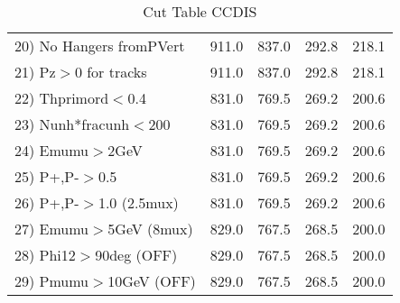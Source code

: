 \begin{table}[h!]
\begin{tabular}{||l||r|r|r|r||}
 20) No Hangers fromPVert &       911.0 &       837.0 &       292.8 &       218.1 \\
 21) Pz$>$0 for tracks    &       911.0 &       837.0 &       292.8 &       218.1 \\
 22) Thprimord$<$0.4      &       831.0 &       769.5 &       269.2 &       200.6 \\
 23) Nunh*fracunh$<$200   &       831.0 &       769.5 &       269.2 &       200.6 \\
 24) Emumu$>$2GeV         &       831.0 &       769.5 &       269.2 &       200.6 \\
 25) P+,P-$>$0.5          &       831.0 &       769.5 &       269.2 &       200.6 \\
 26) P+,P-$>$1.0 (2.5mux) &       831.0 &       769.5 &       269.2 &       200.6 \\
 27) Emumu$>$5GeV  (8mux) &       829.0 &       767.5 &       268.5 &       200.0 \\
 28) Phi12$>$90deg  (OFF) &       829.0 &       767.5 &       268.5 &       200.0 \\
 29) Pmumu$>$10GeV  (OFF) &       829.0 &       767.5 &       268.5 &       200.0 \\
 \hline
 \hline
 \end{tabular}
 \caption{Cut Table  CCDIS  }
 \label{tab-cut_ccdis}
 \end{table}
